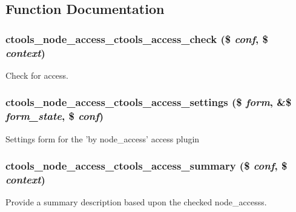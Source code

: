 \subsection{Function Documentation}
\hypertarget{node__access_8inc_a0c00d346504850ec0dbc5a42ac0fb41c}{
\subsubsection[{ctools\_\-node\_\-access\_\-ctools\_\-access\_\-check}]{\setlength{\rightskip}{0pt plus 5cm}ctools\_\-node\_\-access\_\-ctools\_\-access\_\-check (\$ {\em conf}, \/  \$ {\em context})}}
\label{node__access_8inc_a0c00d346504850ec0dbc5a42ac0fb41c}
Check for access. \hypertarget{node__access_8inc_ad8e6a919e6531bec77f192f00ecceef7}{
\subsubsection[{ctools\_\-node\_\-access\_\-ctools\_\-access\_\-settings}]{\setlength{\rightskip}{0pt plus 5cm}ctools\_\-node\_\-access\_\-ctools\_\-access\_\-settings (\$ {\em form}, \/  \&\$ {\em form\_\-state}, \/  \$ {\em conf})}}
\label{node__access_8inc_ad8e6a919e6531bec77f192f00ecceef7}
Settings form for the 'by node\_\-access' access plugin \hypertarget{node__access_8inc_aa6855b44b07550dee12c6c5d123638ef}{
\subsubsection[{ctools\_\-node\_\-access\_\-ctools\_\-access\_\-summary}]{\setlength{\rightskip}{0pt plus 5cm}ctools\_\-node\_\-access\_\-ctools\_\-access\_\-summary (\$ {\em conf}, \/  \$ {\em context})}}
\label{node__access_8inc_aa6855b44b07550dee12c6c5d123638ef}
Provide a summary description based upon the checked node\_\-accesss. 

